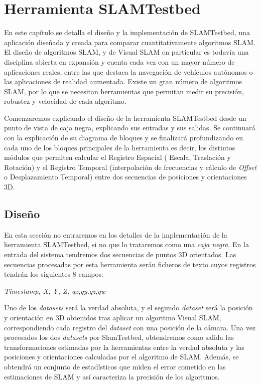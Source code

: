 \newpage
\chapter{Herramienta SLAMTestbed} \label{cap:Herramienta SLAMTestbed} %
En este capítulo se detalla el diseño y la implementación de SLAMTestbed, una aplicación diseñada y creada para comparar cuantitativamente algoritmos SLAM. El diseño de algoritmos SLAM, y de Visual SLAM en particular es todavía una disciplina abierta en expansión y cuenta cada vez con un mayor número de aplicaciones reales, entre las que destaca la navegación de vehículos autónomos o las aplicaciones de realidad aumentada. Existe un gran número de algoritmos SLAM, por lo que se necesitan herramientas que  permitan medir su precisión, robustez y velocidad de cada algoritmo.

Comenzaremos explicando el diseño de la herramienta SLAMTestbed desde un punto de vista de caja negra, explicando sus entradas y sus salidas. Se continuará con la explicación de su diagrama de bloques y se finalizará profundizando en cada uno de los bloques principales de la herramienta es decir, los distintos módulos que permiten calcular el Registro Espacial ( Escala, Traslación y Rotación) y el Registro Temporal (interpolación de frecuencias y cálculo de \textit{Offset} o Desplazamiento Temporal) entre dos secuencias de posiciones y orientaciones 3D.

\section{Diseño}

En esta sección no entraremos en los detalles de la implementación de la herramienta SLAMTestbed, si no que lo trataremos como una \textit{caja negra}.
En la entrada del sistema tendremos dos secuencias de puntos 3D orientados.
Las secuencias procesadas por esta herramienta serán ficheros de texto cuyos registros tendrán los siguientes 8 campos:

\textit{Timestamp, X, Y, Z, qx,qy,qz,qw}

Uno de los \textit{datasets} será la verdad absoluta, y el segundo \textit{dataset} será la posición y orientación en 3D obtenidos tras aplicar un algoritmo Visual SLAM, correspondiendo cada registro del \textit{dataset} con una posición de la cámara.
Una vez procesados los dos \textit{datasets} por SlamTestbed, obtendremos como salida las transformaciones estimadas por la herramientas entre la verdad absoluta y las posiciones y orientaciones calculadas por el algoritmo de SLAM. Además, se obtendrá un conjunto de estadísticos que miden el error cometido en las estimaciones de SLAM y así caracteriza la precisión de los algoritmos.


